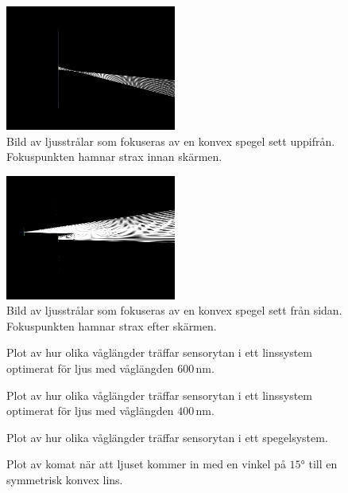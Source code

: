 \documentclass[a4paper]{article}
\newcommand{\unit}[1]{\ensuremath{\,\mathrm{#1}}}
\begin{document}
\begin{figure}[h]
	\centering
	\includegraphics[width=0.5\textwidth]{Data/FRED/FRED1.jpg}
	\caption{Bild av ljusstrålar som fokuseras av en konvex spegel sett uppifrån. Fokuspunkten hamnar strax innan skärmen.}
	\label{fig:astigmAbove}
\end{figure}
\begin{figure}[h]
	\centering
	\includegraphics[width=0.5\textwidth]{Data/FRED/FRED2.jpg}
	\caption{Bild av ljusstrålar som fokuseras av en konvex spegel sett från sidan. Fokuspunkten hamnar strax efter skärmen.}
	\label{fig:astigmSide}
\end{figure}
\begin{figure}[h]
	\centering
	
	\caption{Plot av hur olika våglängder träffar sensorytan i ett linssystem optimerat för ljus med våglängden $600\unit{nm}$.}
	\label{fig:chrLens1}
\end{figure}
\begin{figure}[h]
	\centering
	
	\caption{Plot av hur olika våglängder träffar sensorytan i ett linssystem optimerat för ljus med våglängden $400\unit{nm}$.}
	\label{fig:chrLens2}
\end{figure}
\begin{figure}[h]
	\centering
	
	\caption{Plot av hur olika våglängder träffar sensorytan i ett spegelsystem.}
	\label{fig:chrMir}
\end{figure}
\begin{figure}[h]
	\centering
	
	\caption{Plot av komat när att ljuset kommer in med en vinkel på $15°$ till en symmetrisk konvex lins.}
	\label{fig:comSym}
\end{figure}
\end{document}
